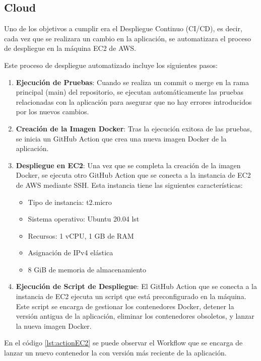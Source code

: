 \subsection{Cloud}

Uno de los objetivos a cumplir era el Despliegue Continuo (CI/CD), es decir, cada vez que se realizara un cambio en la aplicación, se automatizara el proceso de despliegue en
la máquina EC2 de AWS.

Este proceso de despliegue automatizado incluye los siguientes pasos:
\begin{enumerate}
    \item \textbf{Ejecución de Pruebas}: Cuando se realiza un commit o merge en la rama principal (main) del repositorio, se ejecutan automáticamente las pruebas relacionadas con la
     aplicación para asegurar que no hay errores introducidos por los nuevos cambios.
    \item \textbf{Creación de la Imagen Docker}: Tras la ejecución exitosa de las pruebas, se inicia un GitHub Action que crea una nueva imagen Docker de la aplicación.
    \item  \textbf{Despliegue en EC2}: Una vez que se completa la creación de la imagen Docker, se ejecuta otro GitHub Action que se conecta a la instancia de EC2 de AWS mediante SSH.
        Esta instancia tiene las siguientes características:\begin{itemize}
            \item Tipo de instancia: t2.micro
            \item Sistema operativo: Ubuntu 20.04 lst
            \item Recursos: 1 vCPU, 1 GB de RAM
            \item Asignación de IPv4 elástica
            \item 8 GiB de memoria de almacenamiento
        \end{itemize}
    \item  \textbf{Ejecución de Script de Despliegue}: El GitHub Action que se conecta a la instancia de EC2 ejecuta un script que está preconfigurado en la máquina. 
    Este script se encarga de gestionar los contenedores Docker, detener la versión antigua de la aplicación, eliminar los contenedores obsoletos, y 
    lanzar la nueva imagen Docker.
\end{enumerate}
En el código \ref{lst:actionEC2} se puede observar el Workflow que se encarga de lanzar un nuevo contenedor la con versión más reciente de la aplicación.
